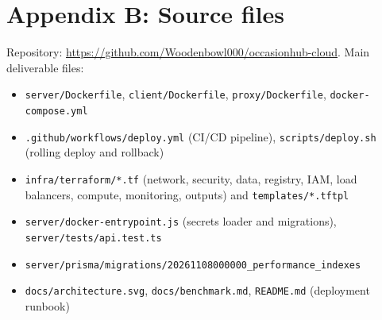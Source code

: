 \documentclass[10pt,a4paper]{article}
\newcommand{\repourl}{\url{https://github.com/Woodenbowl000/occasionhub-cloud}}
\begin{document}
\section*{Appendix B: Source files}
Repository: \repourl. Main deliverable files:
\begin{itemize}
  \item \texttt{server/Dockerfile}, \texttt{client/Dockerfile}, \texttt{proxy/Dockerfile}, \texttt{docker-compose.yml}
  \item \texttt{.github/workflows/deploy.yml} (CI/CD pipeline), \texttt{scripts/deploy.sh} (rolling deploy and rollback)
  \item \texttt{infra/terraform/*.tf} (network, security, data, registry, IAM, load balancers, compute, monitoring, outputs) and \texttt{templates/*.tftpl}
  \item \texttt{server/docker-entrypoint.js} (secrets loader and migrations), \texttt{server/tests/api.test.ts}
  \item \texttt{server/prisma/migrations/20261108000000\_performance\_indexes}
  \item \texttt{docs/architecture.svg}, \texttt{docs/benchmark.md}, \texttt{README.md} (deployment runbook)
\end{itemize}
\end{document}
